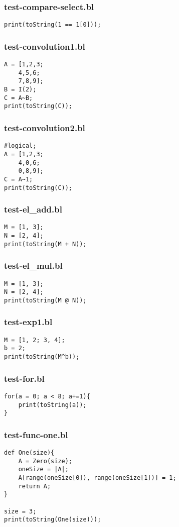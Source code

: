 \subsubsection{test-compare-select.bl}
\begin{lstlisting}
print(toString(1 == 1[0]));
\end{lstlisting}
\subsubsection{test-convolution1.bl}
\begin{lstlisting}
A = [1,2,3;
    4,5,6;
    7,8,9];
B = I(2);
C = A~B;
print(toString(C));
\end{lstlisting}
\subsubsection{test-convolution2.bl}
\begin{lstlisting}
#logical;
A = [1,2,3;
    4,0,6;
    0,8,9];
C = A~1;
print(toString(C));
\end{lstlisting}
\subsubsection{test-el\_add.bl}
\begin{lstlisting}
M = [1, 3];
N = [2, 4];
print(toString(M + N));
\end{lstlisting}
\subsubsection{test-el\_mul.bl}
\begin{lstlisting}
M = [1, 3];
N = [2, 4];
print(toString(M @ N));\end{lstlisting}
\subsubsection{test-exp1.bl}
\begin{lstlisting}
M = [1, 2; 3, 4];
b = 2;
print(toString(M^b));\end{lstlisting}
\subsubsection{test-for.bl}
\begin{lstlisting}
for(a = 0; a < 8; a+=1){
    print(toString(a));
}
\end{lstlisting}
\subsubsection{test-func-one.bl}
\begin{lstlisting}
def One(size){
    A = Zero(size);
    oneSize = |A|;
    A[range(oneSize[0]), range(oneSize[1])] = 1;
    return A;
}

size = 3;
print(toString(One(size)));
\end{lstlisting}

